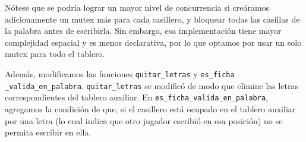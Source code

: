 N\'otese que se podr\'ia lograr un mayor nivel de concurrencia si cre\'aramos adicionamente un mutex m\'as para cada casillero, y bloquear todas las casillas
de la palabra antes de escribirla. Sin embargo, esa implementaci\'on tiene mayor complejidad espacial y es menos declarativa, por lo que optamos por usar 
un solo mutex para todo el tablero.

Adem\'as, modificamos las funciones \verb|quitar_letras| y \verb|es_ficha _valida_en_palabra|.
\verb|quitar_letras| se modific\'o de modo que elimine las letras correspondientes del tablero auxiliar.
En \verb|es_ficha_valida_en_palabra|, agregamos la condici\'on de que, si el casillero est\'a ocupado en el tablero auxiliar por una letra  
(lo cual indica que otro jugador escribi\'o en esa posici\'on) no se permita escribir en ella. 